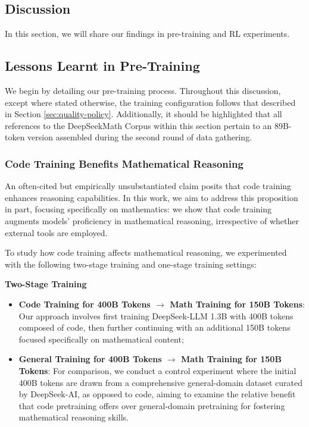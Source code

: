 \begin{itemize}[topsep=0pt]
\begin{itemize}[topsep=0pt]
\section{Discussion}
In this section, we will share our findings in pre-training and RL experiments. 

\subsection{Lessons Learnt in Pre-Training}

We begin by detailing our pre-training process. Throughout this discussion, except where stated otherwise, the training configuration follows that described in Section \ref{sec:quality-policy}. Additionally, it should be highlighted that all references to the DeepSeekMath Corpus within this section pertain to an 89B-token version assembled during the second round of data gathering.

\subsubsection{Code Training Benefits Mathematical Reasoning}

An often-cited but empirically unsubstantiated claim posits that code training enhances reasoning capabilities. In this work, we aim to address this proposition in part, focusing specifically on mathematics: we show that code training augments models' proficiency in mathematical reasoning, irrespective of whether external tools are employed.

To study how code training affects mathematical reasoning, we experimented with the following two-stage training and one-stage training settings:

\textbf{Two-Stage Training}

\begin{itemize}[topsep=0pt]
    \item \textbf{Code Training for 400B Tokens $\rightarrow$ Math Training for 150B Tokens}: Our approach involves first training DeepSeek-LLM 1.3B with 400B tokens composed of code, then further continuing with an additional 150B tokens focused specifically on mathematical content;
    \item \textbf{General Training for 400B Tokens $\rightarrow$ Math Training for 150B Tokens}: For comparison, we conduct a control experiment where the initial 400B tokens are drawn from a comprehensive general-domain dataset curated by DeepSeek-AI, as opposed to code, aiming to examine the relative benefit that code pretraining offers over general-domain pretraining for fostering mathematical reasoning skills.
\end{itemize}


\end{itemize}
\end{itemize}
